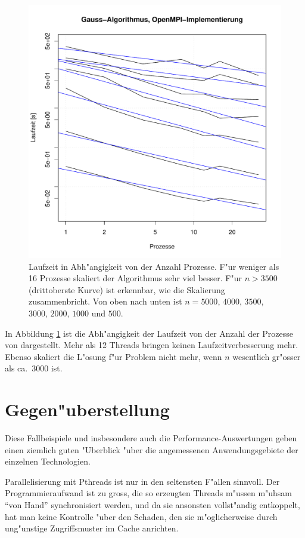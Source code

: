 \begin{figure}
\begin{center}
\includegraphics[width=\hsize]{images/gauss-threads.pdf}
\end{center}
\caption{Laufzeit in Abh"angigkeit von der Anzahl Prozesse.
F"ur weniger als 16 Prozesse skaliert der Algorithmus sehr viel besser.
F"ur $n>3500$ (drittoberste Kurve) ist erkennbar, wie die Skalierung
zusammenbricht. 
Von oben nach unten ist $n=5000$, $4000$, $3500$, $3000$, $2000$, $1000$
und $500$.
\label{openmpi-threads}}
\end{figure}
In Abbildung \ref{openmpi-threads} ist die Abh"angigkeit der Laufzeit von
der Anzahl der Prozesse von dargestellt. Mehr als 12 Threads bringen
keinen Laufzeitverbesserung mehr. Ebenso skaliert die L"osung f"ur 
Problem nicht mehr, wenn $n$ wesentlich gr"osser als ca.~3000 ist.

\section{Gegen"uberstellung}
Diese Fallbeispiele und insbesondere auch die Performance-Auswertungen
geben einen ziemlich guten "Uberblick "uber die angemessenen Anwendungsgebiete
der einzelnen Technologien.

Parallelisierung mit Pthreads ist nur in den seltensten F"allen sinnvoll.
Der Programmieraufwand ist zu gross, die so erzeugten Threads m"ussen
m"uhsam ``von Hand'' synchronisiert werden, und da sie ansonsten
vollst"andig entkoppelt, hat man keine Kontrolle "uber den Schaden,
den sie m"oglicherweise durch ung"unstige Zugriffsmuster im Cache anrichten.

